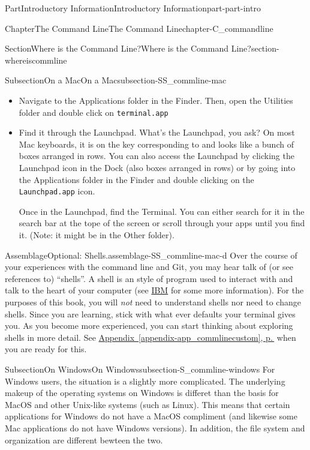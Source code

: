 \documentclass[twoside,10pt,]{book}
\newcommand{\xreffont}{\relax}
\newcommand{\mono}[1]{\texttt{#1}}
\newcommand{\kbd}[1]{\keys{{#1}}}
\begin{document}
\begin{partptx}{Part}{Introductory Information}{}{Introductory Information}{}{}{part-part-intro}
\begin{chapterptx}{Chapter}{The Command Line}{}{The Command Line}{}{}{chapter-C_commandline}
\begin{sectionptx}{Section}{Where is the Command Line?}{}{Where is the Command Line?}{}{}{section-whereiscommline}
\begin{subsectionptx}{Subsection}{On a Mac}{}{On a Mac}{}{}{subsection-SS_commline-mac}
\begin{itemize}[label=\textbullet]
\item{}Navigate to the Applications folder in the Finder. Then, open the Utilities folder and double click on \mono{terminal.app}%
\item{}Find it through the Launchpad. What's the Launchpad, you ask? On most Mac keyboards, it is on the key corresponding to \kbd{F4} and looks like a bunch of boxes arranged in rows. You can also access the Launchpad by clicking the Launchpad icon in the Dock (also boxes arranged in rows) or by going into the Applications folder in the Finder and double clicking on the \mono{Launchpad.app} icon.%
\par
Once in the Launchpad, find the Terminal. You can either search for it in the search bar at the tope of the screen or scroll through your apps until you find it. (Note: it might be in the Other folder).%
\end{itemize}
%
\begin{assemblage}{Assemblage}{Optional: Shells.}{assemblage-SS_commline-mac-d}%
Over the course of your experiences with the command line and Git, you may hear talk of (or see references to) ``shells''. A shell is an style of program used to interact with and talk to the heart of your computer (see \href{https://www.ibm.com/docs/en/aix/7.2?topic=administration-operating-system-shells}{IBM}\footnotemark{} for some more information). For the purposes of this book, you will \emph{not} need to understand shells nor need to change shells. Since you are learning, stick with what ever defaults your terminal gives you. As you become more experienced, you can start thinking about exploring shells in more detail. See \hyperref[appendix-app_commlinecustom]{Appendix~{\xreffont\ref{appendix-app_commlinecustom}}, p.\,\pageref{appendix-app_commlinecustom}} when you are ready for this.%
\end{assemblage}
%
\end{subsectionptx}
%
%
\typeout{************************************************}
\typeout{************************************************}
%
\begin{subsectionptx}{Subsection}{On Windows}{}{On Windows}{}{}{subsection-S_commline-windows}
%
For Windows users, the situation is a slightly more complicated. The underlying makeup of the operating systems on Windows is differet than the basis for MacOS and other Unix-like systems (such as Linux). This means that certain applications for Windows do not have a MacOS compliment (and likewise some Mac applications do not have Windows versions). In addition, the file system and organization are different bewteen the two.%

\end{subsectionptx}
\end{sectionptx}
\end{chapterptx}
\end{partptx}
\end{document}
